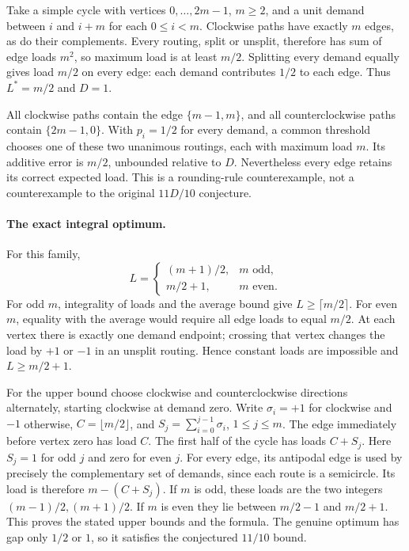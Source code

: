 \documentclass[11pt]{article}
\begin{document}
Take a simple cycle with vertices $0,\ldots,2m-1$, $m\ge2$, and a unit demand
between $i$ and $i+m$ for each $0\le i<m$. Clockwise paths have exactly $m$
edges, as do their complements. Every routing, split or unsplit, therefore
has sum of edge loads $m^2$, so maximum load is at least $m/2$.
Splitting every demand equally gives load $m/2$ on every edge: each demand
contributes $1/2$ to each edge. Thus $L^*=m/2$ and $D=1$.

All clockwise paths contain the edge $\{m-1,m\}$, and all counterclockwise
paths contain $\{2m-1,0\}$. With $p_i=1/2$ for every demand, a common threshold
chooses one of these two unanimous routings, each with maximum load $m$.
Its additive error is $m/2$, unbounded relative to $D$. Nevertheless every
edge retains its correct expected load. This is a rounding-rule counterexample,
not a counterexample to the original $11D/10$ conjecture.

\paragraph{The exact integral optimum.}
For this family,
\[
L=\begin{cases}(m+1)/2,&m\text{ odd},\\m/2+1,&m\text{ even}.\end{cases}
\]
For odd $m$, integrality of loads and the average bound give
$L\ge\lceil m/2\rceil$. For even $m$, equality with the average would require
all edge loads to equal $m/2$. At each vertex there is exactly one demand
endpoint; crossing that vertex changes the load by $+1$ or $-1$ in an
unsplit routing. Hence constant loads are impossible and $L\ge m/2+1$.

For the upper bound choose clockwise and counterclockwise directions
alternately, starting clockwise at demand zero. Write $\sigma_i=+1$ for
clockwise and $-1$ otherwise, $C=\lfloor m/2\rfloor$, and
$S_j=\sum_{i=0}^{j-1}\sigma_i$, $1\le j\le m$.
The edge immediately before vertex zero has load $C$. The first half of the
cycle has loads $C+S_j$. Here $S_j=1$ for odd $j$ and zero for even $j$.
For every edge, its antipodal edge is used by precisely the complementary
set of demands, since each route is a semicircle. Its load is therefore
$m-(C+S_j)$. If $m$ is odd, these loads are the two integers
$(m-1)/2,(m+1)/2$. If $m$ is even they lie between $m/2-1$ and $m/2+1$.
This proves the stated upper bounds and the formula. The genuine optimum
has gap only $1/2$ or $1$, so it satisfies the conjectured $11/10$ bound.
\end{document}

